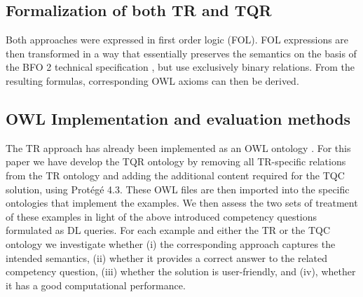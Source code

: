  
%
%
%
%

\subsection*{Formalization of both TR and TQR}
Both approaches were expressed in first order logic (FOL). FOL expressions are then 
transformed in a way that essentially preserves the semantics on the basis of the BFO 2 technical specification \cite{BFO2:ref}, but  
use exclusively binary relations. From the resulting formulas, corresponding OWL axioms can then be derived.  

\subsection*{OWL Implementation and evaluation methods}
The TR approach has already been implemented as an OWL ontology \cite{BFO2:Graz}. For this paper we have develop the TQR ontology by 
removing all TR-specific relations 
from the TR ontology and adding 
the additional content required for the TQC solution, using Prot\'eg\'e 4.3. 
These OWL files are then imported into the specific ontologies that 
implement the examples. We then assess the two sets of treatment of these examples in light of the above introduced competency questions formulated as DL queries. 
For each example and either the TR or the TQC ontology we investigate whether (i) the corresponding approach captures the intended semantics, 
(ii) whether it provides a correct answer to the related competency question, (iii) whether the solution is user-friendly, and (iv), whether it has a good computational performance.   
  